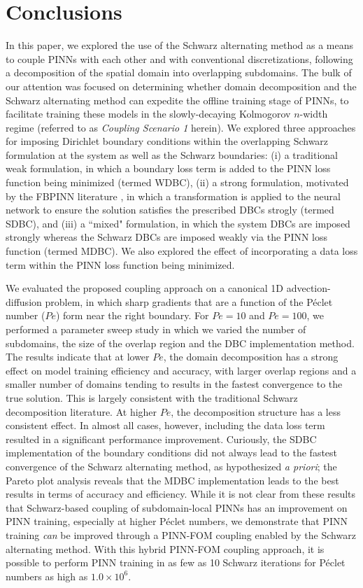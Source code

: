 \documentclass[oneside,final]{csri23}
\begin{document}
\section{Conclusions} \label{WDS:sec:conc}


In this paper, we explored the use of the Schwarz alternating method as a means to couple PINNs with each other and with conventional discretizations, following a decomposition of the spatial domain into overlapping subdomains.  The bulk of our attention was focused on determining whether domain decomposition and the Schwarz alternating method can expedite the offline training stage of PINNs, to facilitate training these models in the slowly-decaying Kolmogorov $n$-width regime (referred to as \textit{Coupling Scenario 1} herein).  
We explored three approaches for imposing Dirichlet boundary conditions within the overlapping Schwarz formulation at the system as well as the Schwarz boundaries: (i) a traditional weak formulation, in which a boundary loss term is added to the PINN loss function being minimized (termed WDBC), (ii) a strong formulation, motivated by the FBPINN literature \cite{WDS:Moseley:2023, WDS:Dolean:2023}, in which a transformation is applied to the neural network to ensure the solution satisfies the prescribed DBCs strogly (termed SDBC), and (iii) a ``mixed" formulation, in which the system DBCs are imposed strongly whereas the Schwarz DBCs are imposed weakly via the PINN loss function (termed MDBC).  We also explored the effect of incorporating a data loss term within the PINN loss function being minimized.  

We evaluated the proposed coupling approach on a canonical 1D advection-diffusion problem, in which sharp gradients that are a function of the P\'{e}clet number ($Pe$) form near the right boundary.  For $Pe = 10$ and $Pe = 100$, we performed a parameter sweep study in which we varied the number of subdomains, the size of the overlap region and the DBC implementation method.  The results indicate that at lower $Pe$, the domain decomposition has a strong effect on model training efficiency and accuracy, with larger overlap regions and a smaller number of domains tending to results in the fastest convergence to the true solution. This is largely consistent with the traditional Schwarz decomposition literature. At higher $Pe$, the decomposition structure has a less consistent effect. In almost all cases, however, including the data loss term resulted in a significant performance improvement. Curiously, the SDBC implementation of the boundary conditions did not always lead to the fastest convergence of the Schwarz alternating method, as hypothesized \textit{a priori}; the Pareto plot analysis reveals that the MDBC implementation leads to the best results in terms of accuracy and efficiency. While it is not clear from these results that Schwarz-based coupling of subdomain-local PINNs has an improvement on PINN training, especially at higher P\'{e}clet numbers, we demonstrate that PINN training \textit{can} be improved through a PINN-FOM coupling enabled by the Schwarz alternating method.  With this hybrid PINN-FOM coupling approach, it is possible to perform PINN training in as few as 10 Schwarz iterations for P\'{e}clet numbers as high as $1.0\times 10^6$.  
\end{document}
